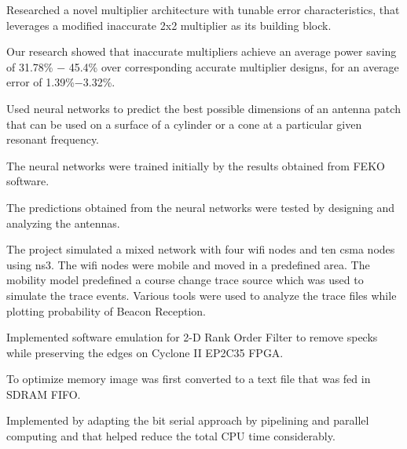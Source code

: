 \documentclass[letterpaper]{deedy-resume} %
\begin{document}
\begin{minipage}[t]{0.76\textwidth}
\begin{tightitemize}
\item Researched a novel multiplier architecture with tunable error characteristics, that leverages a modified inaccurate 2x2 multiplier as its building block.
\item Our research showed that inaccurate multipliers achieve an average power saving of 31.78\% − 45.4\% over corresponding accurate multiplier designs, for an average error of 1.39\%−3.32\%.
\end{tightitemize}
\sectionspace %

\begin{tightitemize}
\item Used neural networks to predict the best possible dimensions of an antenna patch that can be used on a surface of a cylinder or a cone at a particular given resonant frequency. 
\item The neural networks were trained initially by the results obtained from FEKO software.
\item The predictions obtained from the neural networks were tested by designing and analyzing the antennas.
\end{tightitemize}

\sectionspace %

\begin{tightitemize}
\item The project simulated a mixed network with four wifi nodes and ten csma nodes using ns3. The wifi nodes were mobile and moved in a predefined area. The mobility model predefined a course change trace source which was used to simulate the trace events. Various tools were used to analyze the trace files while plotting probability of Beacon Reception.
\end{tightitemize}

\sectionspace %

\begin{tightitemize}
\item Implemented software emulation for 2-D Rank Order Filter to remove specks while preserving the edges on Cyclone II EP2C35 FPGA.
\item To optimize memory image was first converted to a text file that was fed in SDRAM FIFO.
\item Implemented by adapting the bit serial approach by pipelining and parallel computing and that helped reduce the total CPU time considerably.
\end{tightitemize}


\end{minipage}
\end{document}
